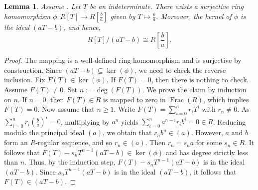 \documentclass[10pt,a4paper]{amsart}
\newtheorem{lemma}{Lemma}
\begin{document}
\begin{lemma}
    \label{lem:ring_presentationJona3}
    Assume . 
    Let $T$ be an indeterminate. 
    There exists a surjective ring homomorphism $\phi\colon R[T] \to R[\frac{b}{a}]$ given by $T\mapsto \frac{b}{a}$.
    Moreover, the kernel of $\phi$ is the ideal $(aT - b)$, and hence,
    \begin{displaymath}
        R[T]/(aT - b) \cong R[\frac{b}{a}].
    \end{displaymath}
\end{lemma}

\begin{proof}
    The mapping is a well-defined ring homomorphism and is surjective by construction.
    Since $(aT-b) \subseteq \ker (\phi)$, we need to check the reverse inclusion. 
    Fix $F(T)\in \ker (\phi)$. 
    If $F(T)=0$, then there is nothing to check.
    Assume $F(T)\not=0$.
    Set $n:= \operatorname{deg} (F(T))$.
    We prove the claim by induction on $n$. 
    If $n=0$, then $F(T)\in R$ is mapped to zero in $\operatorname{Frac}(R)$, which implies $F(T)=0$.
    Now assume that $n\geq 1$.
    Write $F(T)=\sum^n_{i=0} r_i T^i$ with $r_n\not=0$.
    As $\sum^n_{i=0} r_i (\frac{b}{a})^i = 0$, multiplying by $a^n$ yields $\sum^n_{i=0} a^{n-i} r_i b^i = 0 \in R$. 
    Reducing modulo the principal ideal $(a)$, we obtain that $r_n b^n \in (a)$.
    However, $a$ and $b$ form an $R$-regular sequence, and so $r_n \in (a)$. 
    Then $r_n = s_n a$ for some $s_n\in R$. 
    It follows that $F(T)- s_n T^{n-1}(a T - b) \in \ker (\phi)$ and has degree strictly less than $n$. 
    Thus, by the induction step, $F(T)- s_n T^{n-1}(a T - b)$ is in the ideal $(a T - b)$. 
    Since $s_n T^{n-1}(a T - b)$ is in the ideal $(a T - b)$, it follows that $F(T)\in (a T - b)$.
\end{proof}
\end{document}
